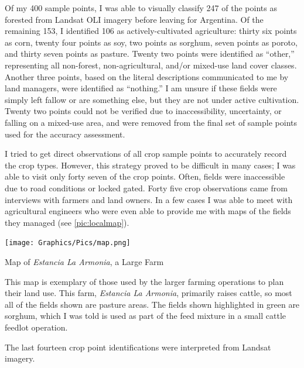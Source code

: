 Of my 400 sample points, I was able to visually classify 247 of the points as forested from Landsat OLI imagery before leaving for Argentina. Of the remaining 153, I identified 106 as actively-cultivated agriculture: thirty six points as corn, twenty four points as soy, two points as sorghum, seven points as poroto, and thirty seven points as pasture. Twenty two points were identified as ``other,'' representing all non-forest, non-agricultural, and/or mixed-use land cover classes. Another three points, based on the literal descriptions communicated to me by land managers, were identified as ``nothing.'' I am unsure if these fields were simply left fallow or are something else, but they are not under active cultivation. Twenty two points could not be verified due to inaccessibility, uncertainty, or falling on a mixed-use area, and were removed from the final set of sample points used for the accuracy assessment.

I tried to get direct observations of all crop sample points to accurately record the crop types. However, this strategy proved to be difficult in many cases; I was able to visit only forty seven of the crop points. Often, fields were inaccessible due to road conditions or locked gated. Forty five crop observations came from interviews with farmers and land owners. In a few cases I was able to meet with agricultural engineers who were even able to provide me with maps of the fields they managed (see \autoref{pic:localmap}).
\begin{ssfigure}
  \centering
  \texttt{[image: Graphics/Pics/map.png]}
  \caption{Map of \textit{Estancia La Armonia}, a Large Farm}
  \label{pic:localmap}
  \medskip
  \small
  This map is exemplary of those used by the larger farming operations to plan their land use. This farm, \textit{Estancia La Armonia}, primarily raises cattle, so most all of the fields shown are pasture areas. The fields shown highlighted in green are sorghum, which I was told is used as part of the feed mixture in a small cattle feedlot operation.
\end{ssfigure}
The last fourteen crop point identifications were interpreted from Landsat imagery.

